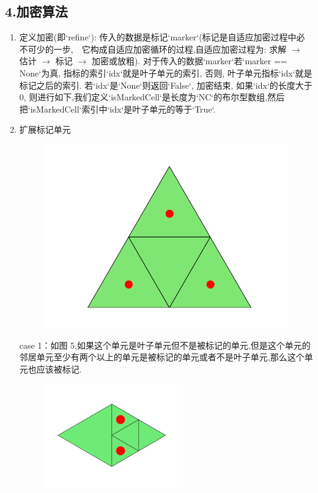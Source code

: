\documentclass{article}
\begin{document}
\subsection{4.加密算法}
\begin{enumerate}
\item 定义加密(即`refine`): 传入的数据是标记`marker`(标记是自适应加密过程中必不可少的一步,　它构成自适应加密循环的过程,自适应加密过程为: 求解 $\to$ 估计 $\to$ 标记 $\to$ 加密或放粗). 对于传入的数据`marker`若`marker == None`为真, 指标的索引`idx`就是叶子单元的索引, 否则, 叶子单元指标`idx`就是标记之后的索引. 若`idx`是`None`则返回`False`, 加密结束, 
如果`idx`的长度大于 $0$, 则进行如下,我们定义`isMarkedCell`是长度为`NC`的布尔型数组,然后把`isMarkedCell`索引中`idx`是叶子单元的等于`True`.
\item 扩展标记单元
\begin{figure}[H]
\centering
\includegraphics[scale=0.5]{./figures/Figure_8.png}
\caption{}
\end{figure}
case 1：如图 5,如果这个单元是叶子单元但不是被标记的单元,但是这个单元的邻居单元至少有两个以上的单元是被标记的单元或者不是叶子单元,那么这个单元也应该被标记.
\begin{figure}[H]
\centering
\begin{minipage}[!htbp]{0.3\linewidth}
    \centerline{\includegraphics[width=6cm]{./figures/Figure_4.png}}

\end{minipage}
\end{figure}
\end{enumerate}
\end{document}
